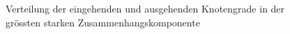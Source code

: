 \begin{figure}[th!]
  \centering
  \caption{Verteilung der eingehenden  und
    ausgehenden  Knotengrade in der grössten
    starken Zusammenhangskomponente}
  \label{fig:degree-dist}
\end{figure}

